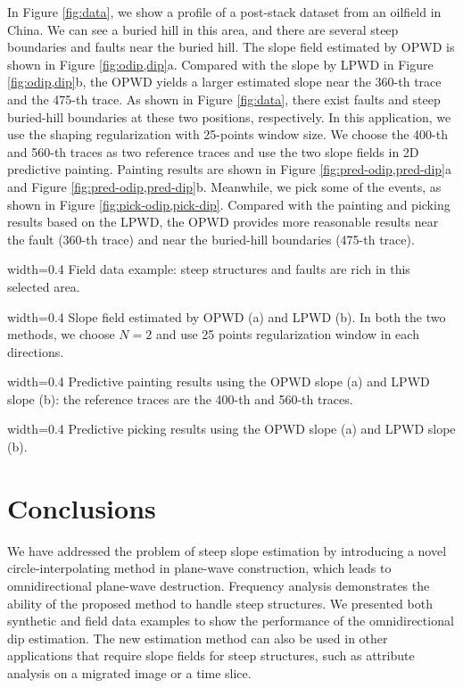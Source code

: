 In Figure \ref{fig:data},
we show a profile of a post-stack dataset from an
oilfield in China.
We can see a buried hill in this area,
and there are several steep boundaries and faults 
near the buried hill.
The slope field estimated by OPWD is shown in Figure \ref{fig:odip,dip}a.
Compared with the slope by LPWD in Figure \ref{fig:odip,dip}b,
the OPWD yields a larger estimated slope
near the 360-th trace and the 475-th trace.
As shown in Figure \ref{fig:data}, 
there exist faults and steep buried-hill boundaries 
at these two positions, respectively.
In this application, we use the shaping regularization with 
25-points window size.
We choose the 400-th and 560-th traces
as two reference traces 
and use the two slope fields in 2D predictive painting.
Painting results are 
shown in Figure \ref{fig:pred-odip,pred-dip}a
and Figure \ref{fig:pred-odip,pred-dip}b.
Meanwhile, we pick some of the events,
as shown in Figure \ref{fig:pick-odip,pick-dip}.
Compared with the painting and picking results based on the LPWD,
the OPWD provides more reasonable results 
near the fault (360-th trace) and near 
the buried-hill boundaries (475-th trace).


{width=0.4\textwidth}{
Field data example: 
steep structures and faults are rich in this selected area.
}

{width=0.4\textwidth}{
Slope field estimated by OPWD (a) and LPWD (b).
In both the two methods, we choose $N=2$ and 
use 25 points regularization window in each directions. 
}


{width=0.4\textwidth}{
Predictive painting results using the OPWD slope (a)
and LPWD slope (b):
the reference traces are the 400-th and 560-th traces.
}

{width=0.4\textwidth}{
Predictive picking results using the OPWD slope (a)
and LPWD slope (b).
}

\section{Conclusions}

We have addressed the problem of steep slope estimation
by introducing a novel circle-interpolating method in plane-wave construction, 
which leads to omnidirectional plane-wave destruction.
Frequency analysis demonstrates the ability 
of the proposed method to handle steep structures.
We presented both synthetic and field data examples to show 
the performance of the omnidirectional dip estimation.
The new estimation method can also be used in other applications 
that require slope fields for steep structures,
such as attribute analysis on
a migrated image or a time slice.

